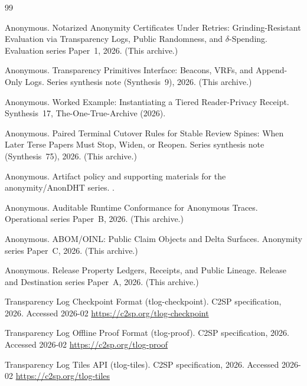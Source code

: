 \documentclass[11pt]{article}
\begin{document}
\begin{thebibliography}{99}

Anonymous.
\newblock Notarized Anonymity Certificates Under Retries: Grinding-Resistant Evaluation via Transparency Logs, Public Randomness, and $\delta$-Spending.
\newblock Evaluation series Paper~1, 2026. (This archive.)

Anonymous.
\newblock Transparency Primitives Interface: Beacons, VRFs, and Append-Only Logs.
\newblock Series synthesis note (Synthesis~9), 2026. (This archive.)

Anonymous.
\newblock Worked Example: Instantiating a Tiered Reader-Privacy Receipt.
\newblock Synthesis~17, The-One-True-Archive (2026).

Anonymous.
\newblock Paired Terminal Cutover Rules for Stable Review Spines: When Later Terse Papers Must Stop, Widen, or Reopen.
\newblock Series synthesis note (Synthesis~75), 2026. (This archive.)

Anonymous.
\newblock Artifact policy and supporting materials for the anonymity/AnonDHT series.
.

Anonymous.
\newblock Auditable Runtime Conformance for Anonymous Traces.
\newblock Operational series Paper~B, 2026. (This archive.)

Anonymous.
\newblock ABOM/OINL: Public Claim Objects and Delta Surfaces.
\newblock Anonymity series Paper~C, 2026. (This archive.)

Anonymous.
\newblock Release Property Ledgers, Receipts, and Public Lineage.
\newblock Release and Destination series Paper~A, 2026. (This archive.)

\newblock Transparency Log Checkpoint Format (tlog-checkpoint).
\newblock C2SP specification, 2026.
\newblock Accessed 2026-02
\newblock \url{https://c2sp.org/tlog-checkpoint}

\newblock Transparency Log Offline Proof Format (tlog-proof).
\newblock C2SP specification, 2026.
\newblock Accessed 2026-02
\newblock \url{https://c2sp.org/tlog-proof}

\newblock Transparency Log Tiles API (tlog-tiles).
\newblock C2SP specification, 2026.
\newblock Accessed 2026-02
\newblock \url{https://c2sp.org/tlog-tiles}


\end{thebibliography}
\end{document}
